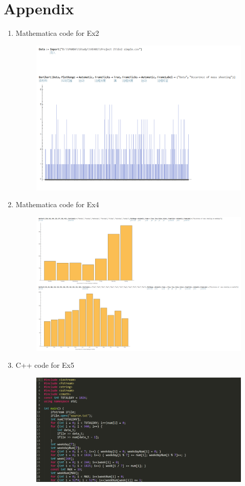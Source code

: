 \documentclass[12pt]{article}
\begin{document}
\section{Appendix}
\begin{enumerate}[-]
\item Mathematica code for Ex2
\begin{figure}[H]
\includegraphics[scale=0.5]{MQ2.jpg}
\end{figure}
\newpage
\item Mathematica code for Ex4
\begin{figure}[H]
\includegraphics[scale=0.35]{MQ4.jpg}
\end{figure}
\item C++ code for Ex5 
\begin{figure}[H]
\includegraphics[scale=0.45]{CQ5-1.jpg}

\end{figure}
\end{enumerate}
\end{document}

